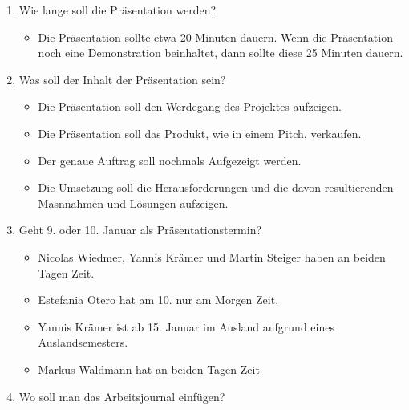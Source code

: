 \documentclass[a4paper, table]{article}
\begin{document}
\begin{enumerate}
    \item Wie lange soll die Präsentation werden?
        \begin{itemize}
            \item Die Präsentation sollte etwa 20 Minuten dauern. Wenn die Präsentation noch eine Demonstration beinhaltet, dann sollte diese 25 Minuten dauern.
        \end{itemize}
    \item Was soll der Inhalt der Präsentation sein?
        \begin{itemize}
            \item Die Präsentation soll den Werdegang des Projektes aufzeigen.
            \item Die Präsentation soll das Produkt, wie in einem Pitch, verkaufen.
            \item Der genaue Auftrag soll nochmals Aufgezeigt werden.
            \item Die Umsetzung soll die Herausforderungen und die davon resultierenden Masnnahmen und Lösungen aufzeigen.
        \end{itemize}
    \item Geht 9. oder 10. Januar als Präsentationstermin?
        \begin{itemize}
            \item Nicolas Wiedmer, Yannis Krämer und Martin Steiger haben an beiden Tagen Zeit.
            \item Estefania Otero hat am 10. nur am Morgen Zeit.
            \item Yannis Krämer ist ab 15. Januar im Ausland aufgrund eines Auslandsemesters.
            \item Markus Waldmann hat an beiden Tagen Zeit
        \end{itemize}
    \item Wo soll man das Arbeitsjournal einfügen?
\end{enumerate}
\end{document}
